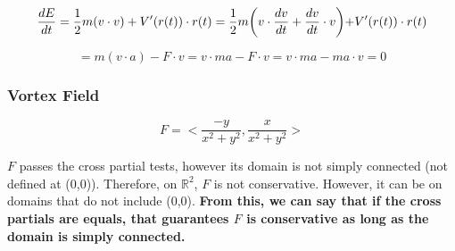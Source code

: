 \documentclass{article}
\begin{document}
$$
\frac{dE}{dt} = \frac{1}{2}m (v \cdot v) + V'(r(t)) \cdot r(t) \\ = \frac{1}{2} m  \biggl(v \cdot \frac{dv}{dt} + \frac{dv}{dt} \cdot v \biggl) + V'(r(t)) \cdot r(t)
$$

$$
= m(v \cdot a) - F \cdot v = v \cdot ma - F \cdot v = v \cdot ma - ma \cdot v = 0
$$

\subsubsection{Vortex Field}

$$
F = \biggl<\frac{-y}{x^2 + y^2}, \frac{x}{x^2 + y^2}\biggl>
$$

$F$ passes the cross partial tests, however its domain is not simply connected (not defined at (0,0)). Therefore, on $\mathbb{R}^2$, $F$ is not conservative. However, it can be on domains that do not include (0,0). \textbf{From this, we can say that if the cross partials are equals, that guarantees $F$ is conservative as long as the domain is simply connected.}
\end{document}
